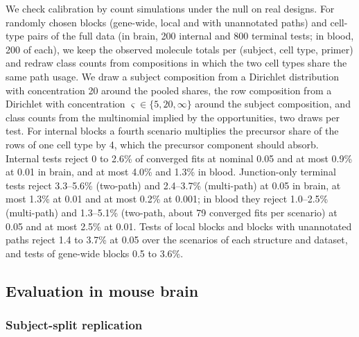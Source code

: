 \documentclass[11pt]{article}
\begin{document}
We check calibration by count simulations under the null on real designs. For randomly chosen blocks (gene-wide, local and with unannotated paths) and cell-type pairs of the full data (in brain, 200 internal and 800 terminal tests; in blood, 200 of each), we keep the observed molecule totals per (subject, cell type, primer) and redraw class counts from compositions in which the two cell types share the same path usage. We draw a subject composition from a Dirichlet distribution with concentration 20 around the pooled shares, the row composition from a Dirichlet with concentration $\varsigma\in\{5,20,\infty\}$ around the subject composition, and class counts from the multinomial implied by the opportunities, two draws per test. For internal blocks a fourth scenario multiplies the precursor share of the rows of one cell type by 4, which the precursor component should absorb. Internal tests reject 0 to 2.6\% of converged fits at nominal 0.05 and at most 0.9\% at 0.01 in brain, and at most 4.0\% and 1.3\% in blood. Junction-only terminal tests reject 3.3--5.6\% (two-path) and 2.4--3.7\% (multi-path) at 0.05 in brain, at most 1.3\% at 0.01 and at most 0.2\% at 0.001; in blood they reject 1.0--2.5\% (multi-path) and 1.3--5.1\% (two-path, about 79 converged fits per scenario) at 0.05 and at most 2.5\% at 0.01. Tests of local blocks and blocks with unannotated paths reject 1.4 to 3.7\% at 0.05 over the scenarios of each structure and dataset, and tests of gene-wide blocks 0.5 to 3.6\%.

\subsection{Evaluation in mouse brain}
\label{sec:evaluation}

\subsubsection{Subject-split replication}
\end{document}
